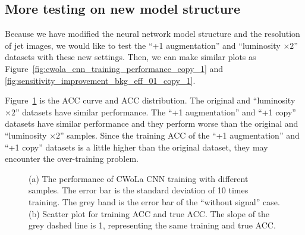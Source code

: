 \documentclass[12pt]{article}
\begin{document}
	\subsection{More testing on new model structure}%
	\label{sub:more_testing_on_new_model_structure}
		Because we have modified the neural network model structure and the resolution of jet images, we would like to test the ``+1 augmentation'' and ``luminosity $\times 2$'' datasets with these new settings. Then, we can make similar plots as Figure~\ref{fig:cwola_cnn_training_performance_copy_1} and \ref{fig:sensitivity_improvement_bkg_eff_01_copy_1}.

		Figure~\ref{fig:cwola_cnn_training_performance_aug_1_x2_copy_1_res_25} is the ACC curve and ACC distribution. The original and ``luminosity $\times 2$'' datasets have similar performance. The ``+1 augmentation'' and ``+1 copy'' datasets have similar performance and they perform worse than the original and ``luminosity $\times 2$'' samples. Since the training ACC of the ``+1 augmentation'' and ``+1 copy'' datasets is a little higher than the original dataset, they may encounter the over-training problem.
		\begin{figure}[htpb]
			\centering
			\caption{(a) The performance of CWoLa CNN training with different samples. The error bar is the standard deviation of 10 times training. The grey band is the error bar of the ``without signal'' case. (b) Scatter plot for training ACC and true ACC. The slope of the grey dashed line is 1, representing the same training and true ACC.}
			\label{fig:cwola_cnn_training_performance_aug_1_x2_copy_1_res_25}
		\end{figure}
\end{document}
